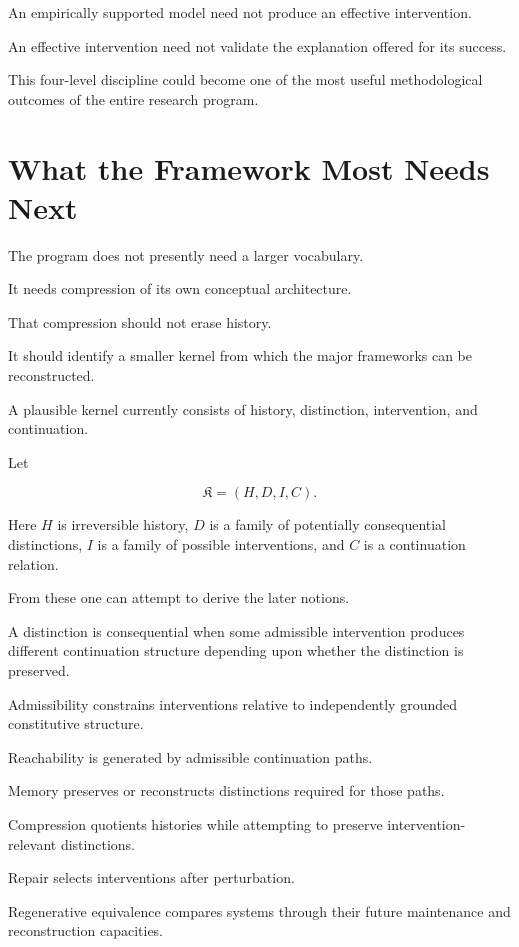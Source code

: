 \documentclass[11pt]{article}
\theoremstyle{remark}
\begin{document}
An empirically supported model need not produce an effective intervention.

An effective intervention need not validate the explanation offered for its success.

This four-level discipline could become one of the most useful methodological outcomes of the entire research program.

\section{What the Framework Most Needs Next}

The program does not presently need a larger vocabulary.

It needs compression of its own conceptual architecture.

That compression should not erase history.

It should identify a smaller kernel from which the major frameworks can be reconstructed.

A plausible kernel currently consists of history, distinction, intervention, and continuation.

Let

\begin{equation}
\mathfrak{K}
=
(
H,D,I,C
).
\end{equation}

Here $H$ is irreversible history, $D$ is a family of potentially consequential distinctions, $I$ is a family of possible interventions, and $C$ is a continuation relation.

From these one can attempt to derive the later notions.

A distinction is consequential when some admissible intervention produces different continuation structure depending upon whether the distinction is preserved.

Admissibility constrains interventions relative to independently grounded constitutive structure.

Reachability is generated by admissible continuation paths.

Memory preserves or reconstructs distinctions required for those paths.

Compression quotients histories while attempting to preserve intervention-relevant distinctions.

Repair selects interventions after perturbation.

Regenerative equivalence compares systems through their future maintenance and reconstruction capacities.
\end{document}
